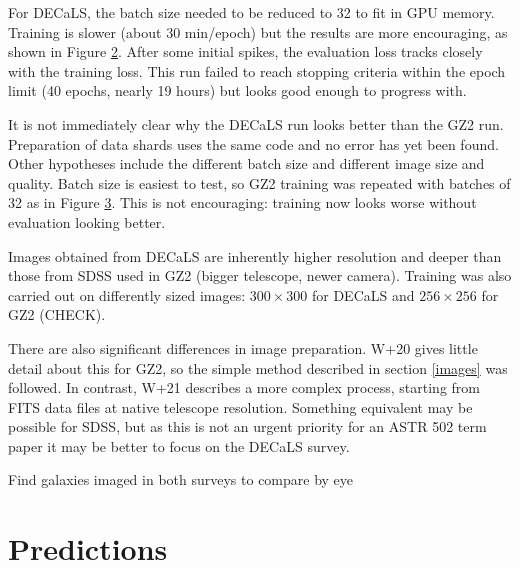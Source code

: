 \documentclass[twocolumn, twocolappendix, tighten]{aastex631}
\newcommand{\todo}{\color{red}{TODO}\color{black}\hspace{2mm}}
\begin{document}
\begin{figure}[htb!]
	\caption{
		\label{fig:gz2_train_64}}
\end{figure}

For DECaLS, the batch size needed to be reduced to 32 to fit in GPU memory. Training is slower (about 30 min/epoch) but the results are more encouraging, as shown in Figure \ref{fig:decals_train}. After some initial spikes, the evaluation loss tracks closely with the training loss. This run failed to reach stopping criteria within the epoch limit (40 epochs, nearly 19 hours) but looks good enough to progress with.

It is not immediately clear why the DECaLS run looks better than the GZ2 run. Preparation of data shards uses the same code and no error has yet been found. Other hypotheses include the different batch size and different image size and quality. Batch size is easiest to test, so GZ2 training was repeated with batches of 32 as in Figure \ref{fig:gz2_train_32}. This is not encouraging: training now looks worse without evaluation looking better.

\begin{figure}[htb!]
	\caption{
		\label{fig:decals_train}}
\end{figure}

Images obtained from DECaLS are inherently higher resolution and deeper than those from SDSS used in GZ2 (bigger telescope, newer camera). Training was also carried out on differently sized images: $300 \times 300$ for DECaLS and $256 \times256$ for GZ2 (\todo CHECK).

There are also significant differences in image preparation. W+20 gives little detail about this for GZ2, so the simple method described in section \ref{images} was followed.  In contrast, W+21 describes a more complex process, starting from FITS data files at native telescope resolution. Something equivalent may be possible for SDSS, but as this is not an urgent priority for an ASTR 502 term paper it may be better to focus on the DECaLS survey.

\todo Find galaxies imaged in both surveys to compare by eye

\begin{figure}[htb!]
	\caption{
		\label{fig:gz2_train_32}}
\end{figure}

\section{Predictions}


{}

\end{document}
